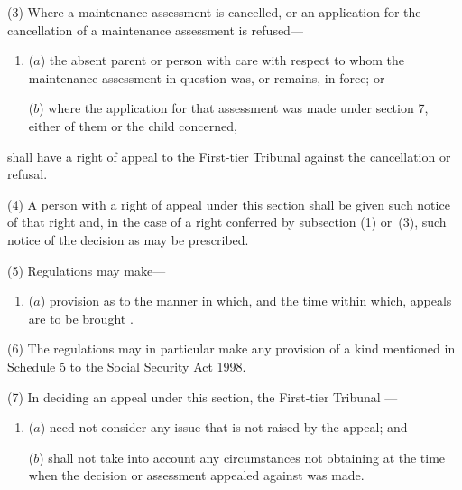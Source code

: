 \documentclass[12pt,a4paper]{article}
\begin{document}
(3) Where a maintenance assessment is cancelled, or an application for the cancellation of a maintenance assessment is refused—
\begin{enumerate}\item[]
($a$) the absent parent or person with care with respect to whom the maintenance assessment in question was, or remains, in force; or

($b$) where the application for that assessment was made under section 7, either of them or the child concerned,
\end{enumerate}
shall have a right of appeal to 
the First-tier Tribunal  %
against the cancellation or refusal.

(4) A person with a right of appeal under this section shall be given such notice of that right and, in the case of a right conferred by subsection (1) or~(3), such notice of the decision as may be prescribed.

(5) Regulations may make—
\begin{enumerate}\item[]
($a$) provision as to the manner in which, and the time within which, appeals are to be brought%
%
.
\end{enumerate}

(6) The regulations may in particular make any provision of a kind mentioned in Schedule 5 to the Social Security Act 1998.

(7) In deciding an appeal under this section, 
the First-tier Tribunal%
—
\begin{enumerate}\item[]
($a$) need not consider any issue that is not raised by the appeal; and

($b$) shall not take into account any circumstances not obtaining at the time when the decision or assessment appealed against was made.
\end{enumerate}

\end{document}
